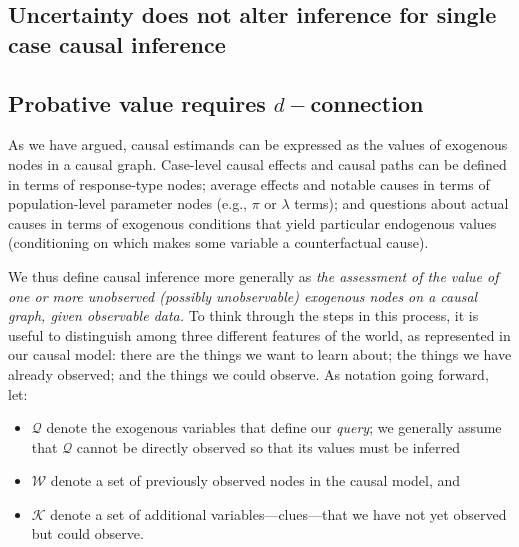 \documentclass[12pt,]{book}
\providecommand{\tightlist}{%
  \setlength{\itemsep}{0pt}\setlength{\parskip}{0pt}}
\begin{document}
\hypertarget{uncertainty-does-not-alter-inference-for-single-case-causal-inference}{%
\subsection{Uncertainty does not alter inference for single case causal inference}\label{uncertainty-does-not-alter-inference-for-single-case-causal-inference}}

\hypertarget{probative-value-requires-d-connection}{%
\subsection{\texorpdfstring{Probative value requires \(d-\)connection}{Probative value requires d-connection}}\label{probative-value-requires-d-connection}}

As we have argued, causal estimands can be expressed as the values of exogenous nodes in a causal graph. Case-level causal effects and causal paths can be defined in terms of response-type nodes; average effects and notable causes in terms of population-level parameter nodes (e.g., \(\pi\) or \(\lambda\) terms); and questions about actual causes in terms of exogenous conditions that yield particular endogenous values (conditioning on which makes some variable a counterfactual cause).

We thus define causal inference more generally as \emph{the assessment of the value of one or more unobserved (possibly unobservable) exogenous nodes on a causal graph, given observable data.} To think through the steps in this process, it is useful to distinguish among three different features of the world, as represented in our causal model: there are the things we want to learn about; the things we have already observed; and the things we could observe. As notation going forward, let:

\begin{itemize}
\tightlist
\item
  \(\mathcal Q\) denote the exogenous variables that define our \emph{query}; we generally assume that \(\mathcal Q\) cannot be directly observed so that its values must be inferred
\item
  \(\mathcal W\) denote a set of previously observed nodes in the causal model, and
\item
  \(\mathcal K\) denote a set of additional variables---clues---that we have not yet observed but could observe.
\end{itemize}
\end{document}
